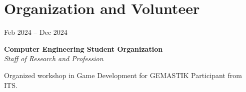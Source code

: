\section{Organization and Volunteer}

\begin{twocolentry}{
     Feb 2024 – Dec 2024
}

\textbf{Computer Engineering Student Organization}\\
\textit{Staff of Research and Profession}
\end{twocolentry}

\vspace{0.10 cm}
\begin{onecolentry}
    \begin{highlights}
        \item Organized workshop in Game Development for GEMASTIK Participant from ITS.
    \end{highlights}
\end{onecolentry}
